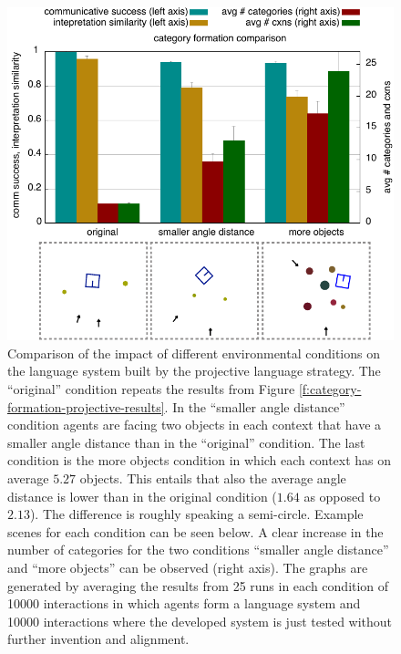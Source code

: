 \begin{figure}
\begin{center}
\includegraphics[width=1.0\columnwidth]{figs/category-formation-projective-compare-original-smaller-angle-more-objects}
\end{center}
\caption[Impact of different environmental conditions on 
projective systems]{%
Comparison of the impact of different environmental conditions on the language
system built by the projective language strategy. The {``original''} condition repeats the results 
from Figure \ref{f:category-formation-projective-results}. In the {``smaller angle distance''} condition
agents are facing two objects in each context that have a smaller angle distance than in the
{``original''} condition. The last condition is the {more objects} condition in which each context has 
on average $5.27$ objects. This entails that also the average angle distance is lower than in the original condition 
($1.64$ as opposed to $2.13$). The difference is roughly speaking a semi-circle.
Example scenes for each condition can be seen below.
A clear increase in the number of categories for the two conditions {``smaller angle distance''} and 
``more objects'' can be observed (right axis). The graphs are generated by averaging the results 
from 25 runs in each condition of 10000 interactions in which agents form a language system and 10000
interactions where the developed system is just tested without further invention and alignment.}
\label{f:compare-original-smaller-angle-more-objects}
\end{figure}

